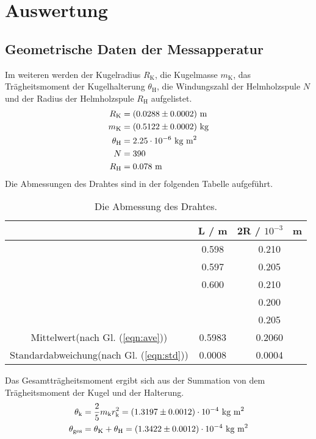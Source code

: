 \section{Auswertung}
\label{sec:Auswertung}

\subsection{Geometrische Daten der Messapperatur}
Im weiteren werden der Kugelradius $R_\text{K}$, die Kugelmasse $m_\text{K}$, das Trägheitsmoment der Kugelhalterung $\theta_\text{H}$, die Windungszahl der Helmholzspule $N$ und der Radius der Helmholzspule $R_\text{H}$ aufgelistet.
\begin{align*}
  R_\text{K} &= (\num{0.0288 +- 0.0002}) \ \text{m} \\
  m_\text{K} &= (\num{0.5122 +- 0.0002}) \ \text{kg} \\
  \theta_\text{H} &= 2.25 \cdot 10^{-6} \ \text{kg m}^2 \\
  N &= 390 \\
  R_\text{H} &= 0.078 \ \text{m}
\end{align*}
Die Abmessungen des Drahtes sind in der folgenden Tabelle aufgeführt.

\begin{table}[H] %
  \centering
  \begin{tabular}{c | c | c}
    \toprule
    & L / m & 2R / $10^{-3}$ \ m \\
    \midrule
    & 0.598 & 0.210 \\
    & 0.597 & 0.205 \\
    & 0.600 & 0.210 \\
    &       & 0.200 \\
    &       & 0.205 \\
    \bottomrule
    Mittelwert(nach Gl. (\ref{eqn:ave}))         & 0.5983 & 0.2060 \\
    Standardabweichung(nach Gl. (\ref{eqn:std})) & 0.0008 & 0.0004 \\
    \bottomrule
  \end{tabular}
  \caption{Die Abmessung des Drahtes.}
  \label{tab:Messwerte}
\end{table}

Das Gesamtträgheitsmoment ergibt sich aus der Summation von dem Trägheitsmoment der Kugel und der Halterung.
\begin{align*}
  \theta_\text{k} & = \frac{2}{5} m_\text{k} r^2_\text{k} = (\num{1.3197 +- 0.0012}) \cdot 10^{-4} \ \text{kg m}^2 \\
  \theta_\text{ges} & = \theta_\text{K} + \theta_\text{H} = (\num{1.3422 +- 0.0012}) \cdot 10^{-4} \ \text{kg m}^2
\end{align*}


